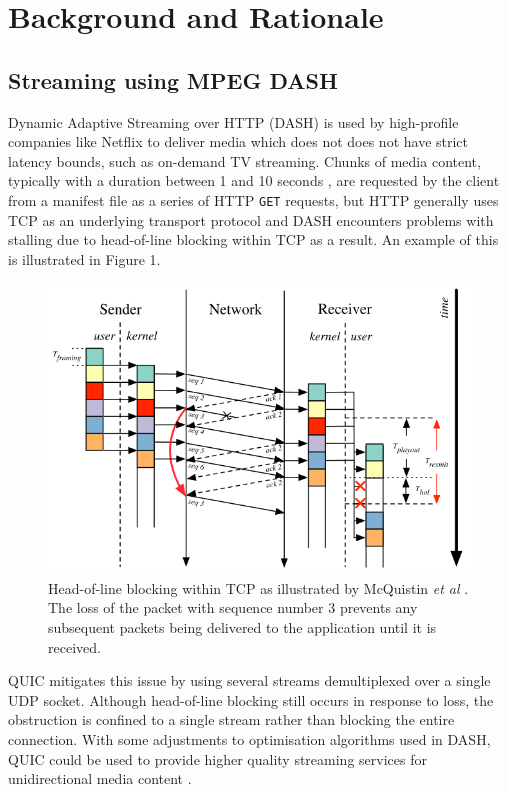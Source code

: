 \documentclass{mprop}
\begin{document}
\newpage


\section{Background and Rationale}

\subsection{Streaming using MPEG DASH}

Dynamic Adaptive Streaming over HTTP (DASH) is used by high-profile companies like Netflix to deliver media which does not does not have strict latency bounds, such as on-demand TV streaming. Chunks of media content, typically with a duration between 1 and 10 seconds \cite{Palmer2018}, are requested by the client from a manifest file as a series of HTTP \texttt{GET} requests, but HTTP generally uses TCP as an underlying transport protocol and DASH encounters problems with stalling due to head-of-line blocking within TCP as a result. An example of this is illustrated in Figure 1.

\begin{figure}[h]
\includegraphics[scale=0.4]{images/holtcp}
\centering
\caption{Head-of-line blocking within TCP as illustrated by McQuistin \textit{et al} \cite{McQuistin2016}. The loss of the packet with sequence number 3 prevents any subsequent packets being delivered to the application until it is received.}
\end{figure}

QUIC mitigates this issue by using several streams demultiplexed 
over a single UDP socket. Although head-of-line blocking still occurs in response to loss, the 
obstruction is confined to a single stream rather than blocking the entire connection. With some 
adjustments to optimisation algorithms used in DASH, QUIC could be used to provide higher quality 
streaming services for unidirectional media content \cite{Bhat2017}.
\end{document}
